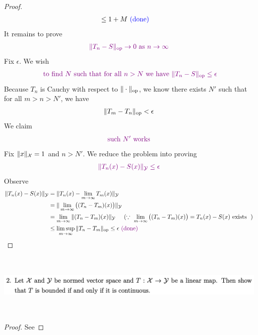 \documentclass{report}
\begin{document}
\begin{proof}
\begin{align*}
&\leq 1+M \textcolor{blue}{\text{ (done) }}
\end{align*}
It remains to prove 
\begin{align*}
  \textcolor{violet}{\| T_n-S \|_{\text{op}}\to 0\text{ as }n\to \infty}
\end{align*}
Fix $\epsilon $. We wish 
\begin{align*}
\textcolor{violet}{\text{ to find $N$ such that for all $n>N$ we have }\| T_n-S \|_\text{op}\leq \epsilon }
\end{align*}
Because $T_n$ is Cauchy with respect to $\| \cdot \|_\text{op}$, we know there exists $N'$ such that for all $m>n>N'$, we have 
 \begin{align*}
\| T_m-T_n \|_\text{op}<\epsilon 
\end{align*}
We claim 
\begin{align*}
\textcolor{violet}{\text{ such $N'$ works }}
\end{align*}
Fix $\| x \|_{\mathcal{X}}=1$ and $n>N'$. We reduce the problem into proving 
 \begin{align*}
   \textcolor{violet}{\| T_n(x)-S(x) \|_{\mathcal{Y}}\leq \epsilon }
\end{align*}
Observe 
\begin{align*}
\| T_n(x)-S(x) \|_\mathcal{Y}&=\| T_n(x)-\lim_{m\to \infty}T_m(x) \|_\mathcal{Y}\\
&=\| \lim_{m\to \infty}\big((T_n-T_m)(x)\big) \|_{\mathcal{Y}}\\
&=\lim_{m\to \infty} \| (T_n-T_m)(x) \|_{\mathcal{Y}}\hspace{0.5cm}(\because \text{ $\lim_{m\to \infty}\big((T_n-T_m)(x)\big)=T_n(x)-S(x)\text{ exists }$ })\\
&\leq \limsup_{m\to\infty} \| T_n-T_m \|_\text{op} \leq \epsilon \textcolor{violet}{\text{ (done) }}
\end{align*}





\end{proof}
\begin{question}{}{}
\includegraphics[height=3cm,width=18cm]{ahw4q2}
\end{question}
\begin{proof}
See 
\end{proof}
\end{document}
